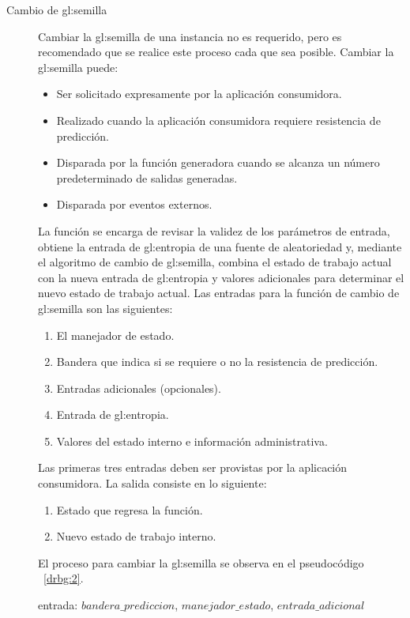 \begin{description}
  \item [Cambio de \gls{gl:semilla}] Cambiar la \gls{gl:semilla} de una
    instancia no es requerido, pero es recomendado que se realice este proceso
    cada que sea posible. Cambiar la \gls{gl:semilla} puede:
    \begin{itemize}
      \item Ser solicitado expresamente por la aplicación consumidora.
      \item Realizado cuando la aplicación consumidora requiere resistencia de
        predicción.
      \item Disparada por la función generadora cuando se alcanza un número
        predeterminado de salidas generadas.
      \item Disparada por eventos externos.
    \end{itemize}
    La función se encarga de revisar la validez de los parámetros de entrada,
    obtiene la entrada de \gls{gl:entropia} de una fuente de aleatoriedad y,
    mediante el algoritmo de cambio de \gls{gl:semilla}, combina el estado de
    trabajo actual con la nueva entrada de \gls{gl:entropia} y valores
    adicionales para determinar el nuevo estado de trabajo actual. Las entradas
    para la función de cambio de \gls{gl:semilla} son las siguientes:
    \begin{enumerate}
      \item El manejador de estado.
      \item Bandera que indica si se requiere o no la resistencia de predicción.
      \item Entradas adicionales (opcionales).
      \item Entrada de \gls{gl:entropia}.
      \item Valores del estado interno e información administrativa.
    \end{enumerate}
    Las primeras tres entradas deben ser provistas por la aplicación
    consumidora. La salida consiste en lo siguiente:
    \begin{enumerate}
      \item Estado que regresa la función.
      \item Nuevo estado de trabajo interno.
    \end{enumerate}
    El proceso para cambiar la \gls{gl:semilla} se observa en el pseudocódigo
   ~\ref{drbg:2}.
\begin{pseudocodigo}[caption={DRBG, cambio de semilla.}, label={drbg:2}]
    entrada:  $bandera\_prediccion$, $manejador\_estado$, $entrada\_adicional$

\end{pseudocodigo}
\end{description}
